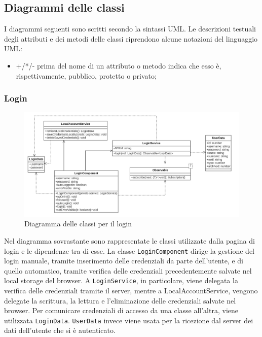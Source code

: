 \subsection{Diagrammi delle classi}
I diagrammi seguenti sono scritti secondo la sintassi UML. Le descrizioni testuali degli attributi e dei metodi delle classi riprendono alcune notazioni del linguaggio UML:
\begin{itemize}
	\item +/*/- prima del nome di un attributo o metodo indica che esso è, rispettivamente, pubblico, protetto o privato;
\end{itemize}

\subsubsection{Login}
\begin{figure}[H]
	\centering
	\includegraphics[width=18cm]{res/images/webapp-login-diagrammaClassi.png}
	\caption{Diagramma delle classi per il login}
	\label{fig:DiagrammaClassiLogin}
\end{figure}
Nel diagramma sovrastante sono rappresentate le classi utilizzate dalla pagina di login e le dipendenze tra di esse. La classe \texttt{LoginComponent} dirige la gestione del login manuale, tramite inserimento delle credenziali da parte dell'utente, e di quello automatico, tramite verifica delle credenziali precedentemente salvate nel local storage del browser. A \texttt{LoginService}, in particolare, viene delegata la verifica delle credenziali tramite il server, mentre a LocalAccountService, vengono delegate la scrittura, la lettura e l'eliminazione delle credenziali salvate nel browser. Per comunicare credenziali di accesso da una classe all'altra, viene utilizzata \texttt{LoginData}. \texttt{UserData} invece viene usata per la ricezione dal server dei dati dell'utente che si è autenticato.

